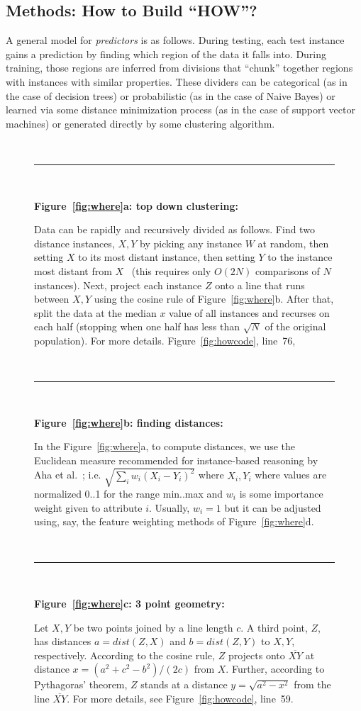 \documentclass[conference]{IEEEtran}
\newcommand{\fig}[1]{Figure~\ref{fig:#1}}
\begin{document}
\subsection{Methods: How to Build ``HOW''?}

A general model for {\em predictors} is as follows. 
During testing, each test instance gains a prediction 
by finding which region of the data it falls into.
During training, those regions are inferred from
divisions that ``chunk'' together regions with instances
with similar properties. These dividers can be categorical (as in the case of decision trees) or probabilistic (as in the
case of Naive Bayes) or learned via some distance minimization
process 
(as in the case of support vector machines) or generated
directly by some clustering algorithm. 


\begin{figure}[t!]
\small
~\hrule~

{\bf \fig{where}a: top down clustering:}

Data can be rapidly and recursively divided   as follows.
Find   two   distance instances,  $X,Y$
by picking any instance $W$ at random, then setting $X$ to its most
distant instance, then setting $Y$ to the instance most distant from
$X$~\cite{fastmap}
(this requires only $O(2N)$ comparisons
of $N$ instances).
Next, project each instance $Z$
onto a line that  runs between $X,Y$ using the cosine
rule of \fig{where}b. After that,  split the data at the median $x$ value of all instances and
recurses on each half  (stopping when
one half has less  than $\sqrt{N}$ of the original population). For more details. \fig{howcode}, line~76, 

~\hrule~
 
{\bf \fig{where}b: finding distances:}

In the \fig{where}a, to compute distances, we use
the Euclidean measure recommended for
instance-based reasoning by Aha et al.~\cite{aha91};
i.e. $\sqrt{\sum_iw_i(X_i-Y_i)^2}$ where $X_i,Y_i$
where values are  normalized 0..1 for the range min..max and 
$w_i$ is some importance weight given to attribute $i$.
Usually, $w_i=1$ but it can be adjusted using, say,
the feature weighting methods of \fig{where}d. 
 
 ~\hrule~
 
{\bf \fig{where}c: 3 point geometry:}
 
Let   $X,Y$ be two points joined by  a line  length $c$.
A third point, $Z$, has distances  $a=dist(Z,X)$ and
$b=dist(Z,Y)$ to $X,Y$, respectively.
According to the cosine rule,   $Z$ projects onto  $\overline{XY}$
at distance $x=(a^2 + c^2 - b^2)/(2c)$ from $X$.
Further, according to Pythagoras' theorem, $Z$ stands at a distance
$y = \sqrt{a^2 - x^2}$ from the line $\overline{XY}$. For more details, see  \fig{howcode}, line~59.


\end{figure}
\end{document}

